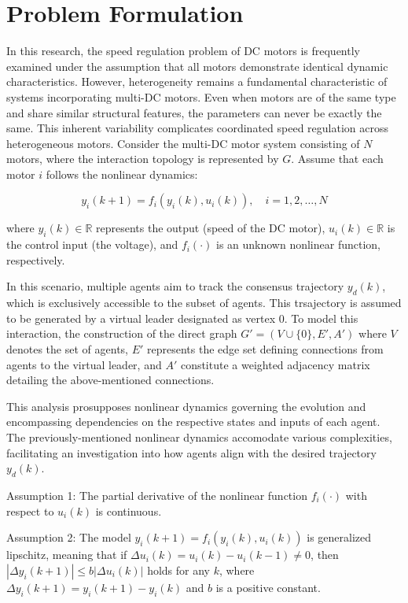 \documentclass[journal,onecolumn]{IEEEtran}
\begin{document}
\section{Problem Formulation}

In this research, the speed regulation problem of DC motors is frequently examined under the assumption that all motors demonstrate identical dynamic characteristics. However, heterogeneity remains a fundamental characteristic of systems incorporating multi-DC motors. Even when motors are of the same type and share similar structural features, the parameters can never be exactly the same. This inherent variability complicates coordinated speed regulation across heterogeneous motors. Consider the multi-DC motor system consisting of $N$ motors, where the interaction topology is represented by $G$. Assume that each motor $i$ follows the nonlinear dynamics:

\begin{equation}
    y_i(k+1) = f_i(y_i(k), u_i(k)), \quad i = 1, 2, \dots, N
\end{equation}

where $y_i(k) \in \mathbb{R}$ represents the output (speed of the DC motor), $u_i(k) \in \mathbb{R}$ is the control input (the voltage), and $f_i(\cdot)$ is an unknown nonlinear function, respectively.



In this scenario, multiple agents aim to track the consensus trajectory \(y_d(k)\), which is exclusively accessible to the subset of agents. This trsajectory is assumed to be generated by a virtual leader designated as vertex 0. To model this interaction, the construction of the direct graph \( G' = (V \cup \{0\}, E', A') \) where \( V \) denotes the set of agents, \( E' \) represents the edge set defining connections from agents to the virtual leader, and \( A' \) constitute a weighted adjacency matrix detailing the above-mentioned connections.

This analysis prosupposes nonlinear dynamics governing the evolution and encompassing dependencies on the respective states and inputs of each agent. The previously-mentioned nonlinear dynamics accomodate various complexities, facilitating an investigation into how agents align with the desired trajectory \(y_d(k)\).

Assumption 1: The partial derivative of the nonlinear function \( f_i(\cdot) \) with respect to \( u_i(k) \) is continuous.

Assumption 2: The model \( y_i(k + 1) = f_i(y_i(k), u_i(k)) \) is generalized lipschitz, meaning that if \( \Delta u_i(k) = u_i(k) - u_i(k - 1) \neq 0 \), then \( | \Delta y_i(k + 1) | \leq b |\Delta u_i(k)| \) holds for any \( k \), where \( \Delta y_i(k + 1) = y_i(k + 1) - y_i(k) \) and \( b \) is a positive constant.
\end{document}
